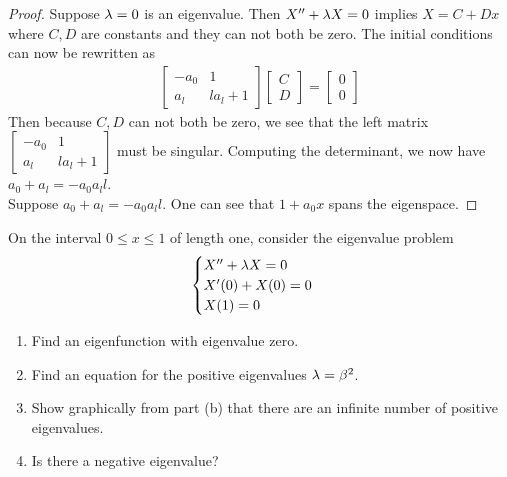 \documentclass{report}
\begin{document}
\begin{proof}
Suppose $\lambda =0$ is an eigenvalue. Then $X''+\lambda X=0$ implies $X=C+Dx$ where  $C,D$ are constants and they can not both be zero. The initial conditions can now be rewritten as 
\begin{align*}
\begin{bmatrix}
  -a_0 & 1 \\
  a_l & la_l+1
\end{bmatrix}\begin{bmatrix}
C\\
D
\end{bmatrix}= \begin{bmatrix}
0\\
0
\end{bmatrix}
\end{align*}
Then because $C,D$ can not both be zero, we see that the left matrix $\begin{bmatrix}
  -a_0 & 1 \\
  a_l & la_l+1
\end{bmatrix}$ must be singular. Computing the determinant, we now have $a_0+a_l=-a_0a_ll$.\\

Suppose $a_0+a_l=-a_0a_ll$. One can see that $1+a_0x$ spans the eigenspace. 
\end{proof}
\begin{question}{}{}
On the interval $0\leq x\leq 1$ of length one, consider the eigenvalue problem 
\begin{align*}
\begin{cases}
  X''+\lambda X =0\\
  X'(0)+X(0)=0 \\
  X(1)=0
\end{cases}
\end{align*}
\begin{enumerate}[label=(\alph*)]
  \item Find an eigenfunction with eigenvalue zero. 
  \item Find an equation for the positive eigenvalues $\lambda =\beta ^2$. 
  \item Show graphically from part (b) that there are an infinite number of positive eigenvalues. 
  \item Is there a negative eigenvalue? 
\end{enumerate}
\end{question}
\end{document}

